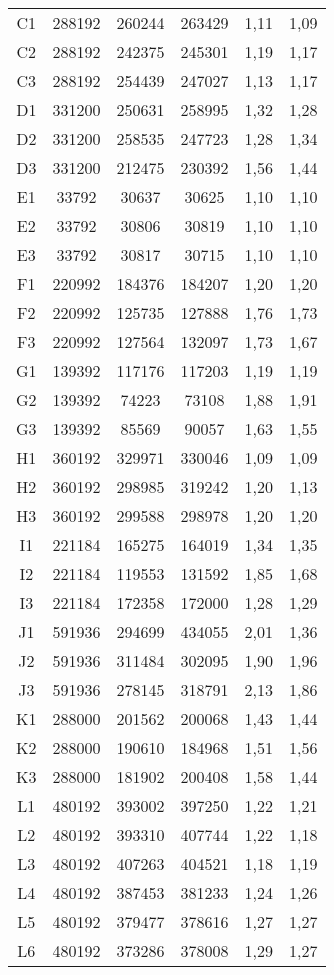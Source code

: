 \begin{center}
\begin{longtable}{cccccc}
    C1    & 288192 & 260244 & 263429 & 1,11  & 1,09 \\
    C2    & 288192 & 242375 & 245301 & 1,19  & 1,17 \\
    C3    & 288192 & 254439 & 247027 & 1,13  & 1,17 \\
    D1    & 331200 & 250631 & 258995 & 1,32  & 1,28 \\
    D2    & 331200 & 258535 & 247723 & 1,28  & 1,34 \\
    D3    & 331200 & 212475 & 230392 & 1,56  & 1,44 \\
    E1    & 33792 & 30637 & 30625 & 1,10  & 1,10 \\
    E2    & 33792 & 30806 & 30819 & 1,10  & 1,10 \\
    E3    & 33792 & 30817 & 30715 & 1,10  & 1,10 \\
    F1    & 220992 & 184376 & 184207 & 1,20  & 1,20 \\
    F2    & 220992 & 125735 & 127888 & 1,76  & 1,73 \\
    F3    & 220992 & 127564 & 132097 & 1,73  & 1,67 \\
    G1    & 139392 & 117176 & 117203 & 1,19  & 1,19 \\
    G2    & 139392 & 74223 & 73108 & 1,88  & 1,91 \\
    G3    & 139392 & 85569 & 90057 & 1,63  & 1,55 \\
    H1    & 360192 & 329971 & 330046 & 1,09  & 1,09 \\
    H2    & 360192 & 298985 & 319242 & 1,20  & 1,13 \\
    H3    & 360192 & 299588 & 298978 & 1,20  & 1,20 \\
    I1    & 221184 & 165275 & 164019 & 1,34  & 1,35 \\
    I2    & 221184 & 119553 & 131592 & 1,85  & 1,68 \\
    I3    & 221184 & 172358 & 172000 & 1,28  & 1,29 \\
    J1    & 591936 & 294699 & 434055 & 2,01  & 1,36 \\
    J2    & 591936 & 311484 & 302095 & 1,90  & 1,96 \\
    J3    & 591936 & 278145 & 318791 & 2,13  & 1,86 \\
    K1    & 288000 & 201562 & 200068 & 1,43  & 1,44 \\
    K2    & 288000 & 190610 & 184968 & 1,51  & 1,56 \\
    K3    & 288000 & 181902 & 200408 & 1,58  & 1,44 \\
    L1    & 480192 & 393002 & 397250 & 1,22  & 1,21 \\
    L2    & 480192 & 393310 & 407744 & 1,22  & 1,18 \\
    L3    & 480192 & 407263 & 404521 & 1,18  & 1,19 \\
    L4    & 480192 & 387453 & 381233 & 1,24  & 1,26 \\
    L5    & 480192 & 379477 & 378616 & 1,27  & 1,27 \\
    L6    & 480192 & 373286 & 378008 & 1,29  & 1,27 \\
\end{longtable}
\end{center}

